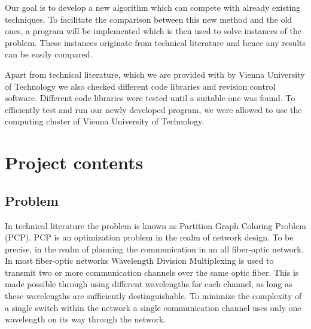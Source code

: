 \documentclass[paper=a4,fontsize=12pt]{scrartcl}
\begin{document}
Our goal is to develop a new algorithm which can compete with already existing techniques. To facilitate the comparison between this new method and the old ones, a program will be implemented which is then used to solve instances of the problem. These instances originate from technical literature and hence any results can be easily compared.


Apart from technical literature, which we are provided with by Vienna University of Technology we also checked different code libraries and revision control software. Different code libraries were tested until a suitable one was found. To efficiently test and run our newly developed program, we were allowed to use the computing cluster of Vienna University of Technology.


\section{Project contents}

\subsection{Problem}
In technical literature the problem is known as Partition Graph Coloring Problem (PCP). PCP is an optimization problem in the realm of network design. To be precise, in the realm of planning the communication in an all fiber-optic network. In most fiber-optic networks Wavelength Division Multiplexing is used to transmit two or more communication channels over the same optic fiber. This is made possible through using different wavelengths for each channel, as long as these wavelengths are sufficiently destinguishable. To minimize the complexity of a single switch within the network a single communication channel uses only one wavelength on its way through the network.
\end{document}
